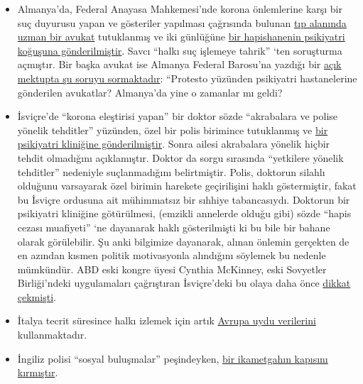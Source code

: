 \begin{itemize}
\tightlist
\item
  Almanya'da, Federal Anayasa Mahkemesi'nde korona önlemlerine karşı bir
  suç duyurusu yapan ve gösteriler yapılması çağrısında bulunan
  \href{http://beatebahner.de/}{tıp alanında uzman bir avukat}
  tutuklanmış ve iki günlüğüne
  \href{https://www.rnz.de/nachrichten/heidelberg_artikel,-nach-aufruf-zu-corona-demo-heidelberger-anwaeltin-in-psychiatrischer-einrichtung-update-_arid,508747.html}{bir
  hapishanenin psikiyatri koğuşuna gönderilmiştir}. Savcı ``halkı suç
  işlemeye tahrik'' `ten soruşturma açmıştır. Bir başka avukat ise
  Almanya Federal Barosu'na yazdığı bir
  \href{https://www.nachrichtenspiegel.de/2020/04/14/brief-an-die-bundesrechtsanwaltskammer-in-causa-bahmer/}{açık
  mektupta şu soruyu sormaktadır}: ``Protesto yüzünden psikiyatri
  hastanelerine gönderilen avukatlar? Almanya'da yine o zamanlar mı
  geldi?
\item
  İsviçre'de ``korona eleştirisi yapan'' bir doktor sözde ``akrabalara
  ve polise yönelik tehditler'' yüzünden, özel bir polis birimince
  tutuklanmış ve
  \href{https://www.srf.ch/news/regional/aargau-solothurn/festnahme-von-corona-kritiker-verschwoerung-oder-normale-intervention-der-aargauer-behoerden}{bir
  psikiyatri kliniğine gönderilmiştir}. Sonra ailesi akrabalara yönelik
  hiçbir tehdit olmadığını açıklamıştır. Doktor da sorgu sırasında
  ``yetkilere yönelik tehditler'' nedeniyle suçlanmadığını belirtmiştir.
  Polis, doktorun silahlı olduğunu varsayarak özel birimin harekete
  geçirilişini haklı göstermiştir, fakat bu İsviçre ordusuna ait
  mühimmatsız bir sıhhiye tabancasıydı. Doktorun bir psikiyatri
  kliniğine götürülmesi, (emzikli annelerde olduğu gibi) sözde ``hapis
  cezası muafiyeti'' `ne dayanarak haklı gösterilmişti ki bu bile bir
  bahane olarak görülebilir. Şu anki bilgimize dayanarak, alınan önlemin
  gerçekten de en azından kısmen politik motivasyonla alındığını
  söylemek bu nedenle mümkündür. ABD eski kongre üyesi Cynthia McKinney,
  eski Sovyetler Birliği'ndeki uygulamaları çağrıştıran İsviçre'deki bu
  olaya daha önce
  \href{https://twitter.com/cynthiamckinney/status/1250075810838581248}{dikkat
  çekmişti}.
\item
  İtalya tecrit süresince halkı izlemek için artık
  \href{https://www.ansa.it/english/news/2020/04/06/coronavirus-italy-activates-satellite-to-monitor-nation-3_f2ffb30c-d550-42f5-82fc-ec1f82c5c625.html}{Avrupa
  uydu verilerini} kullanmaktadır.
\item
  İngiliz polisi ``sosyal buluşmalar'' peşindeyken,
  \href{https://twitter.com/BanTheBBC/status/1249598512427347969}{bir
  ikametgahın kapısını kırmıştır}.
\end{itemize}

